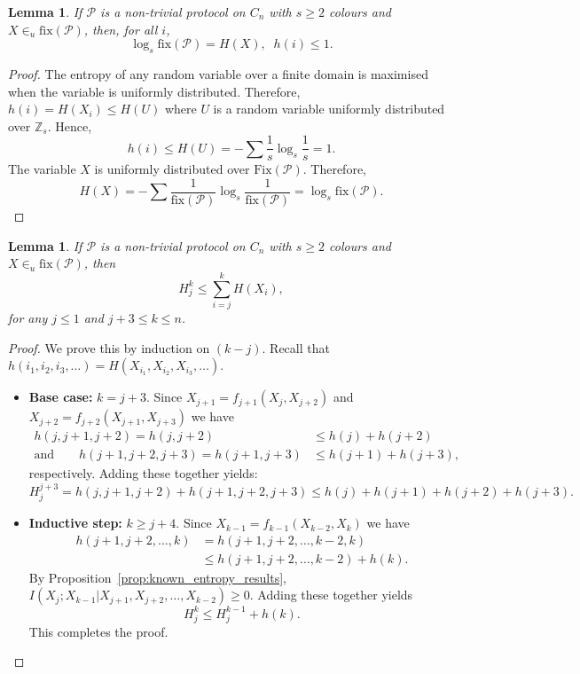 \documentclass{birkjour}
\newtheorem{lem}[thm]{Lemma}
\theoremstyle{indenteddefinition}
\theoremstyle{indenteddefinition}
\numberwithin{equation}{section}
\renewcommand{\Pr}{\mathcal{P}}
\newcommand{\Z}{\mathbb{Z}}
\newcommand{\fix}{\mbox{fix}}
\newcommand{\Fix}{\mbox{Fix}}
\begin{document}
\begin{lem}
\label{lem:H(X),h(i)}
If $\Pr$ is a non-trivial protocol on $C_n$ with $s \geq 2$ colours and $X\in_u \fix(\Pr)$, then, for all $i$, 
	$$\log_s \fix(\Pr) = H(X), \;\; h(i) \leq 1.$$ 
\end{lem}
\begin{proof}
The entropy of any random variable over a finite domain is maximised when the variable is uniformly distributed. Therefore, $h(i) = H(X_i) \leq H(U)$ where $U$ is a random variable uniformly distributed over $\Z_s$. Hence, 
	$$ h(i) \leq H(U) = - \sum \frac{1}{s} \log_s \frac{1}{s} = 1. $$
The variable $X$ is uniformly distributed over $\Fix(\Pr)$. Therefore, 
	$$ H(X) = - \sum \frac{1}{\fix(\Pr)} \log_s \frac{1}{\fix(\Pr)} = \log_s \fix(\Pr). $$
\end{proof}


\begin{lem}
\label{lem:H_j^k<sum(h(i))}
If $\Pr$ is a non-trivial protocol on $C_n$ with $s \geq 2$ colours and $X\in_u \fix(\Pr)$, then 
	$$ H_j^k \leq \sum_{i=j}^{k} H(X_i) ,$$
for any $j \leq 1$ and $j+3 \leq k \leq n$. 
\end{lem}
\begin{proof}
We prove this by induction on $(k-j)$. Recall that $h(i_1,i_2,i_3, \ldots ) = H(X_{i_1},X_{i_2},X_{i_3}, \ldots )$.
	\begin{itemize}
	\item {\bf Base case: }$k=j+3$. Since $X_{j+1} = f_{j+1}(X_j,X_{j+2})$ and $X_{j+2} = f_{j+2}(X_{j+1},X_{j+3})$ we have 
		\begin{align*}
		h(j,j+1,j+2) = h(j,j+2) & \leq h(j)+h(j+2) \\ \mbox{and} \qquad 
		h(j+1,j+2,j+3) = h(j+1,j+3) & \leq h(j+1)+h(j+3) ,
		\end{align*}
	respectively. Adding these together yields:
		$$ H_j^{j+3} = h(j,j+1,j+2) + h(j+1,j+2,j+3) \leq h(j)+h(j+1)+h(j+2)+h(j+3). $$
	\item {\bf Inductive step:} $k \geq j+4$. Since $X_{k-1} = f_{k-1}(X_{k-2},X_k)$ we have 
		\begin{align*}
		h(j+1,j+2, \ldots ,k) 
		& = h(j+1,j+2, \ldots ,k-2,k) \\
		& \leq h(j+1,j+2, \ldots ,k-2)+h(k). 
		\end{align*}
	By Proposition~\ref{prop:known_entropy_results}, 
	$ I(X_j ; X_{k-1} | X_{j+1},X_{j+2}, \ldots ,X_{k-2})\geq 0$. Adding these together yields  
		$$ H_j^k \leq H_j^{k-1} + h(k). $$
	This completes the proof. 
	\end{itemize}
\end{proof}
\end{document}
